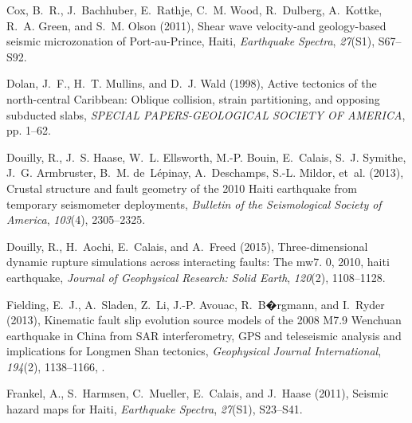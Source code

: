 \documentclass[linenumbers,draft]{agujournal}
\begin{document}
\begin{thebibliography}{65}
Cox, B.~R., J.~Bachhuber, E.~Rathje, C.~M. Wood, R.~Dulberg, A.~Kottke, R.~A.
  Green, and S.~M. Olson (2011), {Shear wave velocity-and geology-based seismic
  microzonation of Port-au-Prince, Haiti}, \textit{Earthquake Spectra},
  \textit{27}(S1), S67--S92.

Dolan, J.~F., H.~T. Mullins, and D.~J. Wald (1998), Active tectonics of the
  north-central {Caribbean: Oblique} collision, strain partitioning, and
  opposing subducted slabs, \textit{SPECIAL PAPERS-GEOLOGICAL SOCIETY OF
  AMERICA}, pp. 1--62.

Douilly, R., J.~S. Haase, W.~L. Ellsworth, M.-P. Bouin, E.~Calais, S.~J.
  Symithe, J.~G. Armbruster, B.~M. de~L{\'e}pinay, A.~Deschamps, S.-L. Mildor,
  et~al. (2013), Crustal structure and fault geometry of the 2010 {Haiti}
  earthquake from temporary seismometer deployments, \textit{Bulletin of the
  Seismological Society of America}, \textit{103}(4), 2305--2325.

Douilly, R., H.~Aochi, E.~Calais, and A.~Freed (2015), Three-dimensional
  dynamic rupture simulations across interacting faults: The mw7. 0, 2010,
  haiti earthquake, \textit{Journal of Geophysical Research: Solid Earth},
  \textit{120}(2), 1108--1128.

Fielding, E.~J., A.~Sladen, Z.~Li, J.-P. Avouac, R.~B�rgmann, and I.~Ryder
  (2013), {Kinematic fault slip evolution source models of the 2008 M7.9
  Wenchuan earthquake in China from SAR interferometry, GPS and teleseismic
  analysis and implications for Longmen Shan tectonics}, \textit{Geophysical
  Journal International}, \textit{194}(2), 1138--1166,
  .

Frankel, A., S.~Harmsen, C.~Mueller, E.~Calais, and J.~Haase (2011), {Seismic
  hazard maps for Haiti}, \textit{Earthquake Spectra}, \textit{27}(S1),
  S23--S41.


\end{thebibliography}
\end{document}
